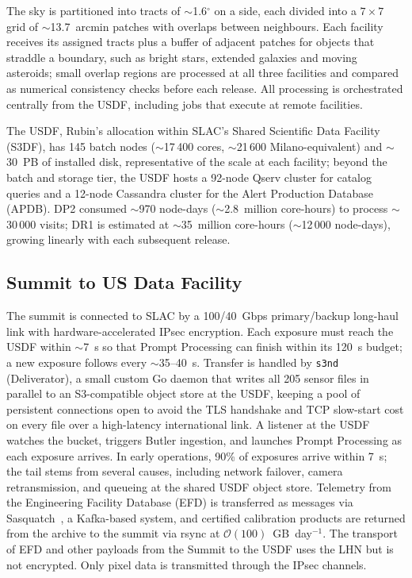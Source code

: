 The sky is partitioned into tracts of $\sim$1.6$^\circ$ on a side, each divided into a $7\times7$ grid of $\sim$13.7~arcmin patches with overlaps between neighbours.
Each facility receives its assigned tracts plus a buffer of adjacent patches for objects that straddle a boundary, such as bright stars, extended galaxies and moving asteroids; small overlap regions are processed at all three facilities and compared as numerical consistency checks before each release.
All processing is orchestrated centrally from the USDF, including jobs that execute at remote facilities.

The USDF, Rubin's allocation within SLAC's Shared Scientific Data Facility (S3DF), has 145 batch nodes ($\sim$17\,400 cores, $\sim$21\,600 Milano-equivalent) and $\sim$30~PB of installed disk, representative of the scale at each facility; beyond the batch and storage tier, the USDF hosts a 92-node Qserv cluster for catalog queries and a 12-node Cassandra cluster for the Alert Production Database (APDB).
DP2 consumed $\sim$970 node-days ($\sim$2.8~million core-hours) to process $\sim$30\,000 visits; DR1 is estimated at $\sim$35~million core-hours ($\sim$12\,000 node-days), growing linearly with each subsequent release.

\subsection{Summit to US Data Facility}
\label{sec:summit-usdf}

The summit is connected to SLAC by a 100/40~Gbps primary/backup long-haul link with hardware-accelerated IPsec encryption.
Each exposure must reach the USDF within $\sim$7~s so that Prompt Processing can finish within its 120~s budget; a new exposure follows every $\sim$35--40~s.
Transfer is handled by \texttt{s3nd} (Deliverator), a small custom Go daemon that writes all 205 sensor files in parallel to an S3-compatible object store at the USDF, keeping a pool of persistent connections open to avoid the TLS handshake and TCP slow-start cost on every file over a high-latency international link.
A listener at the USDF watches the bucket, triggers Butler ingestion, and launches Prompt Processing as each exposure arrives.
In early operations, 90\% of exposures arrive within 7~s; the tail stems from several causes, including network failover, camera retransmission, and queueing at the shared USDF object store.
Telemetry from the Engineering Facility Database (EFD) is transferred as messages via Sasquatch~\cite{2024SPIE13101E..1MF}, a Kafka-based system, and certified calibration products are returned from the archive to the summit via rsync at $\mathcal{O}(100)$~GB~day$^{-1}$.
The transport of EFD and other payloads from the Summit to the USDF uses the LHN but is not encrypted.
Only pixel data is transmitted through the IPsec channels.

